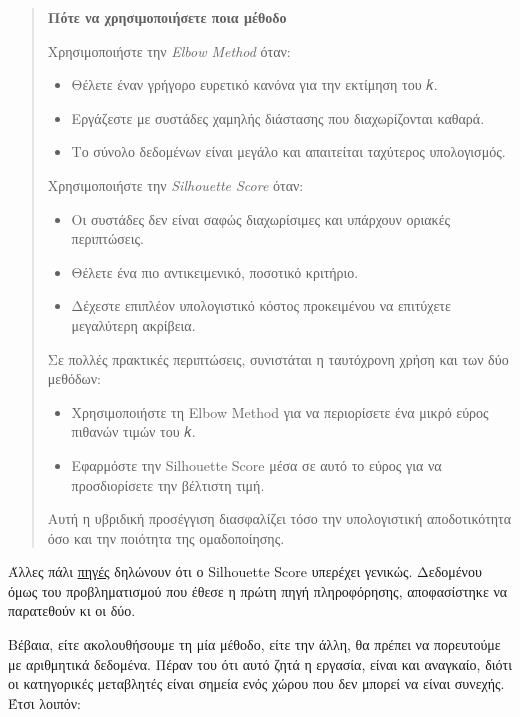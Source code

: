 \documentclass[
]{article}
\begin{document}
\begin{quote}
\textbf{Πότε να χρησιμοποιήσετε ποια μέθοδο}

Χρησιμοποιήστε την \emph{Elbow Method} όταν:

\begin{itemize}
\item
  Θέλετε έναν γρήγορο ευρετικό κανόνα για την εκτίμηση του 𝑘.
\item
  Εργάζεστε με συστάδες χαμηλής διάστασης που διαχωρίζονται καθαρά.
\item
  Το σύνολο δεδομένων είναι μεγάλο και απαιτείται ταχύτερος υπολογισμός.
\end{itemize}

Χρησιμοποιήστε την \emph{Silhouette Score} όταν:

\begin{itemize}
\item
  Οι συστάδες δεν είναι σαφώς διαχωρίσιμες και υπάρχουν οριακές
  περιπτώσεις.
\item
  Θέλετε ένα πιο αντικειμενικό, ποσοτικό κριτήριο.
\item
  Δέχεστε επιπλέον υπολογιστικό κόστος προκειμένου να επιτύχετε
  μεγαλύτερη ακρίβεια.
\end{itemize}

Σε πολλές πρακτικές περιπτώσεις, συνιστάται η ταυτόχρονη χρήση και των
δύο μεθόδων:

\begin{itemize}
\item
  Χρησιμοποιήστε τη Elbow Method για να περιορίσετε ένα μικρό εύρος
  πιθανών τιμών του 𝑘.
\item
  Εφαρμόστε την Silhouette Score μέσα σε αυτό το εύρος για να
  προσδιορίσετε την βέλτιστη τιμή.
\end{itemize}

Αυτή η υβριδική προσέγγιση διασφαλίζει τόσο την υπολογιστική
αποδοτικότητα όσο και την ποιότητα της ομαδοποίησης.
\end{quote}

Άλλες πάλι
\href{https://adria708.medium.com/elbow-method-vs-silhouette-co-efficient-in-determining-the-number-of-clusters-33baff2fbeee}{πηγές}
δηλώνουν ότι ο Silhouette Score υπερέχει γενικώς. Δεδομένου όμως του
προβληματισμού που έθεσε η πρώτη πηγή πληροφόρησης, αποφασίστηκε να
παρατεθούν κι οι δύο.

Βέβαια, είτε ακολουθήσουμε τη μία μέθοδο, είτε την άλλη, θα πρέπει να
πορευτούμε με αριθμητικά δεδομένα. Πέραν του ότι αυτό ζητά η εργασία,
είναι και αναγκαίο, διότι οι κατηγορικές μεταβλητές είναι σημεία ενός
χώρου που δεν μπορεί να είναι συνεχής. Έτσι λοιπόν:
\end{document}
